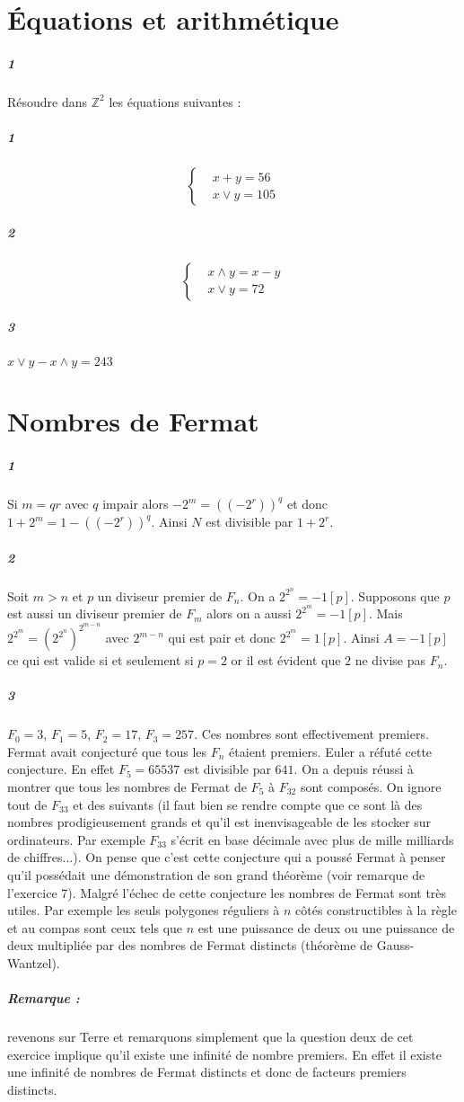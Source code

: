 \documentclass[10pt,a4paper]{article}
\begin{document}
\section{Équations et arithmétique}
\subparagraph{1}

Résoudre dans $\mathbb{Z}^2$ les équations suivantes :
\subparagraph{1} \begin{equation*}
\left\lbrace
\begin{aligned}
&x+y=56 \\
& x \vee y =105
\end{aligned}
\right.
\end{equation*}
\subparagraph{2}
\begin{equation*}
\left\lbrace
\begin{aligned}
&x \wedge y = x-y \\
&x \vee y =72
\end{aligned}
\right.
\end{equation*}
\subparagraph{3} $x \vee y - x \wedge y=243$
\section{Nombres de Fermat}
\subparagraph{1}Si $m = qr$ avec $q$ impair alors $-2^m = \left((-2^r)\right)^q$ et donc $1 + 2^m = 1 - \left((-2^r)\right)^q$. Ainsi $N$ est divisible par $1 + 2^r$. 
\subparagraph{2}Soit $m>n$ et $p$ un diviseur premier de $F_n$. On a $2^{2^n} = -1[p]$. Supposons que $p$ est aussi un diviseur premier de $F_m$ alors on a aussi $2^{2^m} = -1[p]$. Mais $2^{2^m} = \left(2^{2^n}\right)^{2^{m-n}}$ avec $2^{m-n}$ qui est pair et donc $2^{2^m} = 1[p]$. Ainsi $A = -1[p]$ ce qui est valide si et seulement si $p=2$ or il est évident que $2$ ne divise pas $F_n$.
\subparagraph{3}$F_0 = 3$, $F_1 = 5$, $F_2 = 17$, $F_3 = 257$. Ces nombres sont effectivement premiers. Fermat avait conjecturé que tous les $F_n$ étaient premiers. Euler a réfuté cette conjecture. En effet $F_5 = 65537$ est divisible par $641$. On a depuis réussi à montrer que tous les nombres de Fermat de $F_5$ à $F_32$ sont composés. On ignore tout de $F_{33}$ et des suivants (il faut bien se rendre compte que ce sont là des nombres prodigieusement grands et qu'il est inenvisageable de les stocker sur ordinateurs. Par exemple $F_{33}$ s'écrit en base décimale avec plus de mille milliards de chiffres...). On pense que c'est cette conjecture qui a poussé Fermat à penser qu'il possédait une démonstration de son grand théorème (voir remarque de l'exercice 7). Malgré l'échec de cette conjecture les nombres de Fermat sont très utiles. Par exemple les seuls polygones réguliers à $n$ côtés constructibles à la règle et au compas sont ceux tels que $n$ est une puissance de deux ou une puissance de deux multipliée par des nombres de Fermat distincts (théorème de Gauss-Wantzel).
\subparagraph{Remarque :} revenons sur Terre et remarquons simplement que la question deux de cet exercice implique qu'il existe une infinité de nombre premiers. En effet il existe une infinité de nombres de Fermat distincts et donc de facteurs premiers distincts.
\end{document}
